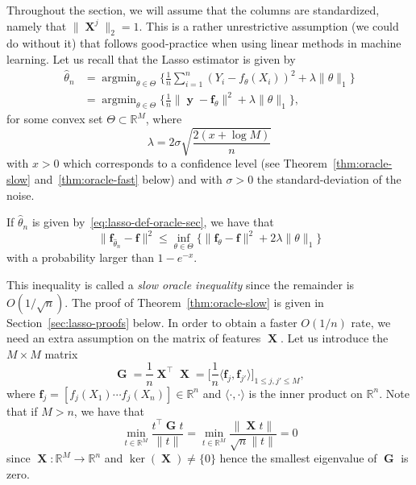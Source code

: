 \documentclass[
	fontsize=11pt, %
	twoside=false, %
	numbers=noenddot, %
]{kaobook}
\DeclareMathOperator{\bG}{{\boldsymbol G}}
\DeclareMathOperator{\bX}{{\boldsymbol X}}
\renewcommand{\bf}{{\boldsymbol f}}
\DeclareMathOperator{\by}{{\boldsymbol y}}
\DeclareMathOperator*{\argmin}{argmin}
\newcommand{\R}{\mathbb R}
\newcommand{\wh}{\widehat}
\newcommand{\norm}[1]{\| #1 \|}
\newcommand{\inr}[1]{\langle #1 \rangle}
\begin{document}
Throughout the section, we will assume that the columns are standardized, namely that $\norm{\bX^j}_2 = 1$.
This is a rather unrestrictive assumption (we could do without it) that follows good-practice when using linear methods in machine learning.
Let us recall that the Lasso estimator is given by
\begin{equation}
	\label{eq:lasso-def-oracle-sec}
	\begin{split}
	\wh \theta_n &= \argmin_{\theta \in \Theta} \Big\{ \frac 1n \sum_{i=1}^n (Y_i - f_\theta(X_i))^2 + \lambda \norm{\theta}_1 \Big\} \\
	&= \argmin_{\theta \in \Theta} \Big\{ 
	\frac 1n \norm{\by - \bf_\theta}^2 + \lambda \norm{\theta}_1 
	\Big\},
	\end{split}
\end{equation}
for some convex set $\Theta \subset \R^M$, where 
\begin{equation*}
	\lambda = 2 \sigma \sqrt{\frac{2(x + \log M)}{n}}
\end{equation*}
with $x > 0$ which corresponds to a confidence level (see Theorem~\ref{thm:oracle-slow} and~\ref{thm:oracle-fast} below) and with $\sigma > 0$ the standard-deviation of the noise.
\begin{theorem}
	\label{thm:oracle-slow}
	If $\wh \theta_n$ is given by~\eqref{eq:lasso-def-oracle-sec}, we have that
	\begin{equation*}
		\norm{\bf_{\wh \theta_n} - \bf}^2 \leq \inf_{\theta \in \Theta} 
		\Big\{ \norm{\bf_{\theta} - \bf}^2  + 2 \lambda \norm{\theta}_1 \Big\}
	\end{equation*}
	with a probability larger than $1 - e^{-x}$.
\end{theorem}
This inequality is called a \emph{slow oracle inequality} since the remainder is $O(1 / \sqrt{n})$.
The proof of Theorem~\ref{thm:oracle-slow} is given in Section~\ref{sec:lasso-proofs} below.
In order to obtain a faster $O(1 / n)$ rate, we need an extra assumption on the matrix of features $\bX$.
Let us introduce the $M \times M$ matrix 
\begin{equation*}
	\bG = \frac 1n \bX^\top \bX = 
	\Big[ \frac 1n \inr{\bf_j, \bf_{j'}} \Big]_{1 \leq j, j' \leq M},
\end{equation*}
where $\bf_j = [f_j(X_1) \cdots f_j(X_n)] \in \R^n$ and $\inr{\cdot, \cdot}$ is the inner product on $\R^n$.
Note that if $M > n$, we have that
\begin{equation*}
	\min_{t \in \R^M} \frac{t^\top \bG t}{\norm{t}} 
	= \min_{t \in \R^M} \frac{\norm{\bX t}}{\sqrt n \norm{t}} = 0
\end{equation*}
since $\bX : \R^M \rightarrow \R^n$ and $\ker(\bX) \neq \{ 0 \}$ hence the smallest eigenvalue of $\bG$ is zero.
\end{document}
